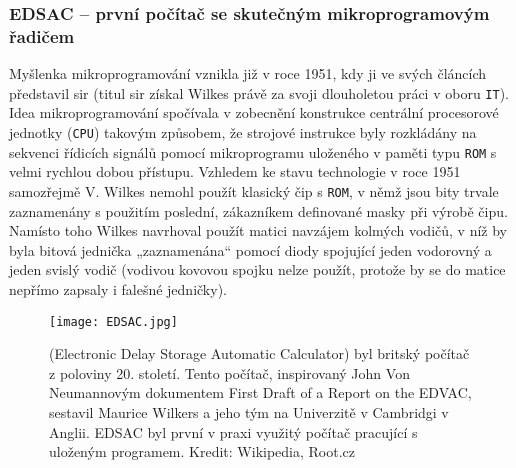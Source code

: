       \subsubsection{EDSAC – první počítač se skutečným mikroprogramovým řadičem}
        Myšlenka mikroprogramování vznikla již v roce 1951, kdy ji ve svých článcích představil sir 
        \wikiEWilkes (titul sir získal Wilkes právě za svoji dlouholetou práci v oboru 
        \texttt{IT}). Idea mikroprogramování spočívala v zobecnění konstrukce centrální procesorové 
        jednotky (\texttt{CPU}) takovým způsobem, že strojové instrukce byly rozkládány na sekvenci 
        řídicích signálů pomocí mikroprogramu uloženého v paměti typu \texttt{ROM} s velmi rychlou 
        dobou přístupu. Vzhledem ke stavu technologie v roce 1951 samozřejmě V. Wilkes nemohl 
        použít klasický čip s \texttt{ROM}, v němž jsou bity trvale zaznamenány s použitím 
        poslední, zákazníkem definované masky při výrobě čipu. Namísto toho Wilkes navrhoval použít 
        matici navzájem kolmých vodičů, v níž by byla bitová jednička „zaznamenána“ pomocí diody 
        spojující jeden vodorovný a jeden svislý vodič (vodivou kovovou spojku nelze použít, 
        protože by se do matice nepřímo zapsaly i falešné jedničky).
        
        \begin{figure}[ht!]   %
          \centering
          \texttt{[image: EDSAC.jpg]}
          \caption{\wikiEDSAC (Electronic Delay Storage Automatic Calculator) byl britský počítač z 
                   poloviny 20. století. Tento počítač, inspirovaný John Von Neumannovým dokumentem 
                   First Draft of a Report on the EDVAC, sestavil Maurice Wilkers a jeho tým na 
                   Univerzitě v Cambridgi v Anglii. EDSAC byl první v praxi využitý počítač 
                   pracující s uloženým programem. Kredit: Wikipedia, Root.cz}
          \label{MIT:fig_edsac}
        \end{figure}
        
